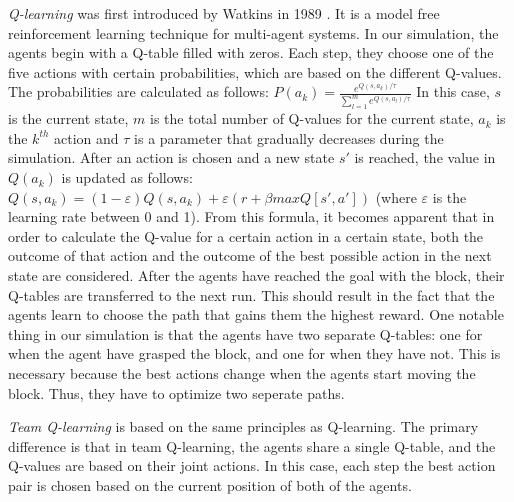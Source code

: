 \textit{Q-learning} was first introduced by Watkins in 1989 \cite{watkins1989}. It is a model free reinforcement learning technique for multi-agent systems. In our simulation, the agents begin with a Q-table filled with zeros. Each step, they choose one of the five actions with certain probabilities, which are based on the different Q-values. The probabilities are calculated as follows: $P(a_{k})=\frac{e^{Q(s,a_{k})/ \tau}}{\sum_{l=1}^{m}e^{Q(s,a_{l})/ \tau}}$ In this case, $s$ is the current state, $m$ is the total number of Q-values for the current state, $a_{k}$ is the $k^{th}$ action and $\tau$ is a parameter that gradually decreases during the simulation. After an action is chosen and a new state $s'$ is reached, the value in $Q(a_{k})$ is updated as follows: $Q(s,a_{k}) = (1- \varepsilon) Q(s,a_{k})+ \varepsilon (r+ \beta maxQ[s',a'])$ (where $\varepsilon$ is the learning rate between 0 and 1). From this formula, it becomes apparent that in order to calculate the Q-value for a certain action in a certain state, both the outcome of that action and the outcome of the best possible action in the next state are considered. After the agents have reached the goal with the block, their Q-tables are transferred to the next run. This should result in the fact that the agents learn to choose the path that gains them the highest reward. One notable thing in our simulation is that the agents have two separate Q-tables: one for when the agent have grasped the block, and one for when they have not. This is necessary because the best actions change when the agents start moving the block. Thus, they have to optimize two seperate paths.

\textit{Team Q-learning} is based on the same principles as Q-learning. The primary difference is that in team Q-learning, the agents share a single Q-table, and the Q-values are based on their joint actions. In this case, each step the best action pair is chosen based on the current position of both of the agents.